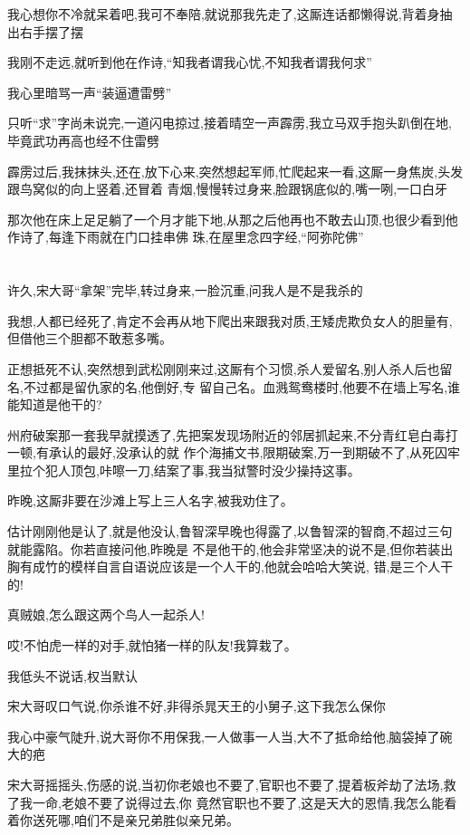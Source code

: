 ﻿\documentclass[12pt]{article}
\begin{document}
我心想你不冷就呆着吧,我可不奉陪,就说那我先走了,这厮连话都懒得说,背着身抽出右手摆了摆

我刚不走远,就听到他在作诗,``知我者谓我心忧,不知我者谓我何求''

我心里暗骂一声``装逼遭雷劈''

只听``求''字尚未说完,一道闪电掠过,接着晴空一声霹雳,我立马双手抱头趴倒在地,毕竟武功再高也经不住雷劈

霹雳过后,我抹抹头,还在,放下心来,突然想起军师,忙爬起来一看,这厮一身焦炭,头发跟鸟窝似的向上竖着,还冒着
青烟,慢慢转过身来,脸跟锅底似的,嘴一咧,一口白牙

那次他在床上足足躺了一个月才能下地,从那之后他再也不敢去山顶,也很少看到他作诗了,每逢下雨就在门口挂串佛
珠,在屋里念四字经,``阿弥陀佛''
\section{}

许久,宋大哥``拿架''完毕,转过身来,一脸沉重,问我人是不是我杀的

我想,人都已经死了,肯定不会再从地下爬出来跟我对质,王矮虎欺负女人的胆量有,但借他三个胆都不敢惹多嘴。

正想抵死不认,突然想到武松刚刚来过,这厮有个习惯,杀人爱留名,别人杀人后也留名,不过都是留仇家的名,他倒好,专
留自己名。血溅鸳鸯楼时,他要不在墙上写名,谁能知道是他干的?

州府破案那一套我早就摸透了,先把案发现场附近的邻居抓起来,不分青红皂白毒打一顿,有承认的最好,没承认的就
作个海捕文书,限期破案,万一到期破不了,从死囚牢里拉个犯人顶包,咔嚓一刀,结案了事,我当狱警时没少操持这事。

昨晚,这厮非要在沙滩上写上三人名字,被我劝住了。

估计刚刚他是认了,就是他没认,鲁智深早晚也得露了,以鲁智深的智商,不超过三句就能露陷。你若直接问他,昨晚是
不是他干的,他会非常坚决的说不是,但你若装出胸有成竹的模样自言自语说应该是一个人干的,他就会哈哈大笑说,
错,是三个人干的!

真贼娘,怎么跟这两个鸟人一起杀人!

哎!不怕虎一样的对手,就怕猪一样的队友!我算栽了。

我低头不说话,权当默认

宋大哥叹口气说,你杀谁不好,非得杀晁天王的小舅子,这下我怎么保你

我心中豪气陡升,说大哥你不用保我,一人做事一人当,大不了抵命给他,脑袋掉了碗大的疤

宋大哥摇摇头,伤感的说,当初你老娘也不要了,官职也不要了,提着板斧劫了法场,救了我一命,老娘不要了说得过去,你
竟然官职也不要了,这是天大的恩情,我怎么能看着你送死哪,咱们不是亲兄弟胜似亲兄弟。
\end{document}
